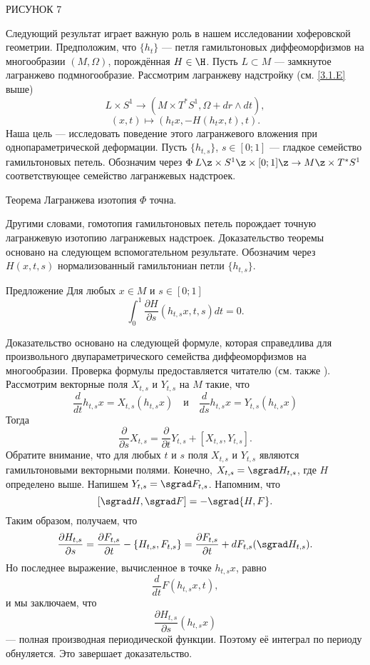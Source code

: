 РИСУНОК 7

Следующий результат играет важную роль в нашем исследовании хоферовской геометрии.
Предположим, что $\{h_t\}$ --- петля гамильтоновых диффеоморфизмов на многообразии $(M, \Omega)$, порождённая $H \in \H$.
Пусть $L \subset M$ --- замкнутое лагранжево подмногообразие.
Рассмотрим лагранжеву надстройку (см. \ref{3.1.E} выше)
\[L \times S^1 \to (M \times T^\ast S^1, \Omega + dr \wedge dt),\]
\[(x, t) \mapsto (h_t x, -H (h_t x, t), t).\]
Наша цель --- исследовать поведение этого лагранжевого вложения при однопараметрической деформации.
Пусть $\{h_{t, s}\}$, $s \in [0; 1]$ --- гладкое семейство гамильтоновых петель.
Обозначим через $\Phi\: L \z\times S^1 \z\times [0; 1] \z\to M \z\times T^\ast S^1$ соответствующее семейство лагранжевых надстроек.

\begin{thm}{Теорема}\label{6.1.B}
Лагранжева изотопия $\Phi$ точна.
\end{thm}

Другими словами, гомотопия гамильтоновых петель порождает точную лагранжевую изотопию лагранжевых надстроек.
Доказательство теоремы основано на следующем вспомогательном результате.
Обозначим через $H (x, t, s)$ нормализованный гамильтониан петли $\{h_{t, s}\}$.

\begin{thm}{Предложение}\label{6.1.C}
Для любых $x \in M$ и $s \in [0; 1]$
\[\int_0^1 \frac{\partial H}{\partial s} (h_{t, s} x, t, s) dt = 0.\]
\end{thm}

Доказательство основано на следующей формуле, которая справедлива для произвольного двупараметрического семейства диффеоморфизмов на многообразии.
Проверка формулы предоставляется читателю (см. также \cite{B1}).
Рассмотрим векторные поля $X_{t, s}$ и $Y_{t, s}$ на $M$ такие, что 
\[\frac{d}{dt} h_{t, s} x = X_{t, s} (h_{t, s} x)
\quad\text{и}\quad
\frac{d}{ds} h_{t, s} x = Y_{t, s} (h_{t, s} x)
\]
Тогда 
\[\frac{\partial}{\partial s}  X_{t, s} = \frac{\partial}{\partial t}Y_{t, s} + [X_{t, s}, Y_{t, s}].\]
Обратите внимание, что для любых $t$ и $s$ поля $X_{t, s}$ и $Y_{t, s}$ являются гамильтоновыми векторными полями.
Конечно, $X_{t, s} = \sgrad H_{t, s}$, где $H$ определено выше.
Напишем $Y_{t, s} = \sgrad F_{t, s}$.
Напомним, что 
\[[\sgrad H, \sgrad F] = -\sgrad  \{H, F\}.\]
Таким образом, получаем, что 
\[\frac{\partial H_{t, s}}{\partial s}
= \frac{\partial F_{t, s}}{\partial t} - \{H_{t, s}, F_{t, s}\}
= \frac{\partial F_{t, s}}{\partial t}+dF_{t,s}(\sgrad H_{t,s}).
\]
Но последнее выражение, вычисленное в точке $h_{t, s} x$, равно
\[\frac{d}{dt} F (h_{t, s} x, t),\]
и мы заключаем, что 
\[\frac{\partial H_{t, s}}{\partial s} (h_{t, s} x)\]
--- полная производная периодической функции.
Поэтому её интеграл по периоду обнуляется.
Это завершает доказательство.
\qeds

